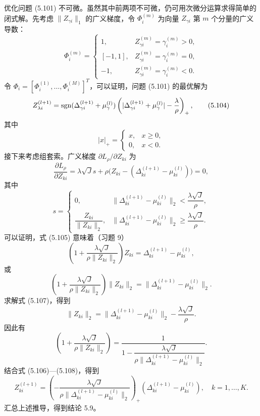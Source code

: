 优化问题 (5.101) 不可微。虽然其中前两项不可微，仍可用次微分运算求得简单的闭式解。先考虑 $\lVert Z_{\gamma i}\rVert_1$ 的广义梯度，令 $\Phi_i^{(m)}$ 为向量 $Z_{\gamma i}$ 第 $m$ 个分量的广义导数：
\[
\Phi_i^{(m)}=\begin{cases}
1,&Z_{\gamma i}^{(m)}=\gamma_i^{(m)}>0,\\
[-1,1],&Z_{\gamma i}^{(m)}=\gamma_i^{(m)}=0,\\
-1,&Z_{\gamma i}^{(m)}=\gamma_i^{(m)}<0.
\end{cases}
\]
令 $\Phi_i=[\Phi_i^{(1)},\ldots,\Phi_i^{(M)}]^T$，可以证明，问题 (5.101) 的最优解为
\begin{equation}
Z_{\lambda i}^{(l+1)}
=\operatorname{sgn}(\Delta_{\gamma i}^{(l+1)}+\mu_\gamma^{(l)})
\left(|\Delta_{\gamma i}^{(l+1)}+\mu_\gamma^{(l)}|-\frac\lambda\rho\right)_+,
\tag{5.104}
\end{equation}
其中
\[
|x|_+=\begin{cases}x,&x\geq0,\\0,&x<0.\end{cases}
\]
接下来考虑组套索。广义梯度 $\partial L_\rho/\partial Z_{ki}$ 为
\begin{equation}
\frac{\partial L_\rho}{\partial Z_{ki}}
=\lambda\sqrt Js+\rho\bigl(Z_{ki}-(\Delta_{ki}^{(l+1)}-\mu_{ki}^{(l)})\bigr)=0,
\tag{5.105}
\end{equation}
其中
\[
s=\begin{cases}
0,&\lVert\Delta_{ki}^{(l+1)}-\mu_{ki}^{(l)}\rVert_2<\dfrac{\lambda\sqrt J}{\rho},\\[7pt]
\dfrac{Z_{ki}}{\lVert Z_{ki}\rVert_2},
&\lVert\Delta_{ki}^{(l+1)}-\mu_{ki}^{(l)}\rVert_2\geq\dfrac{\lambda\sqrt J}{\rho}.
\end{cases}
\]
可以证明，式 (5.105) 意味着（习题 9）
\begin{equation}
\left(1+\frac{\lambda\sqrt J}{\rho\lVert Z_{ki}\rVert_2}\right)Z_{ki}
=\Delta_{ki}^{(l+1)}-\mu_{ki}^{(l)},
\tag{5.106}
\end{equation}
或
\begin{equation}
\left(1+\frac{\lambda\sqrt J}{\rho\lVert Z_{ki}\rVert_2}\right)\lVert Z_{ki}\rVert_2
=\lVert\Delta_{ki}^{(l+1)}-\mu_{ki}^{(l)}\rVert_2.
\tag{5.107}
\end{equation}
求解式 (5.107)，得到
\[
\lVert Z_{ki}\rVert_2=\lVert\Delta_{ki}^{(l+1)}-\mu_{ki}^{(l)}\rVert_2-\frac{\lambda\sqrt J}{\rho}.
\]
因此有
\begin{equation}
\left(1+\frac{\lambda\sqrt J}{\rho\lVert Z_{ki}\rVert_2}\right)
=\frac1{1-\dfrac{\lambda\sqrt J}{\rho\lVert\Delta_{ki}^{(l+1)}-\mu_{ki}^{(l)}\rVert_2}}.
\tag{5.108}
\end{equation}
结合式 (5.106)—(5.108)，得到
\begin{equation}
Z_{ki}^{(l+1)}
=\left(-\frac{\lambda\sqrt J}{\rho\lVert\Delta_{ki}^{(l+1)}-\mu_{ki}^{(l)}\rVert_2}\right)_+
(\Delta_{ki}^{(l+1)}-\mu_{ki}^{(l)}),\quad k=1,\ldots,K.
\tag{5.109}
\end{equation}
汇总上述推导，得到结论 5.9。

